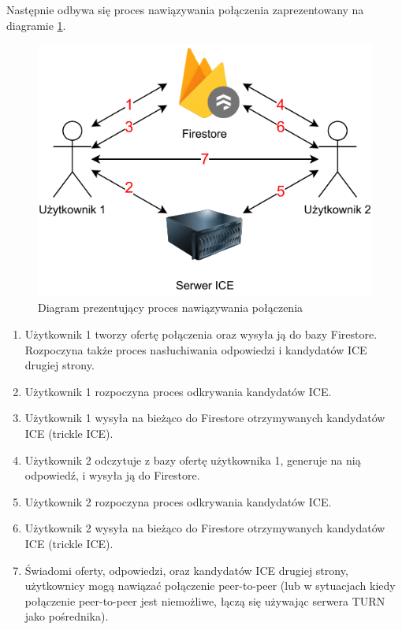 Następnie odbywa się proces nawiązywania połączenia zaprezentowany na diagramie \ref{fig:webrtc_connection_init}.

\begin{figure}[H]
  \centering
  \includegraphics{img/webrtc-connection-init}
  \caption{Diagram prezentujący proces nawiązywania połączenia}
  \label{fig:webrtc_connection_init}
\end{figure}

\begin{enumerate}
  \item Użytkownik 1 tworzy ofertę połączenia oraz wysyła ją do bazy Firestore. Rozpoczyna także proces nasłuchiwania
        odpowiedzi i kandydatów ICE drugiej strony.
  \item Użytkownik 1 rozpoczyna proces odkrywania kandydatów ICE.
  \item Użytkownik 1 wysyła na bieżąco do Firestore otrzymywanych kandydatów ICE (trickle ICE).
  \item Użytkownik 2 odczytuje z bazy ofertę użytkownika 1, generuje na nią odpowiedź, i wysyła ją do Firestore.
  \item Użytkownik 2 rozpoczyna proces odkrywania kandydatów ICE.
  \item Użytkownik 2 wysyła na bieżąco do Firestore otrzymywanych kandydatów ICE (trickle ICE).
  \item Świadomi oferty, odpowiedzi, oraz kandydatów ICE drugiej strony, użytkownicy mogą nawiązać połączenie
        peer-to-peer (lub w sytuacjach kiedy połączenie peer-to-peer jest niemożliwe, łączą się używając serwera TURN
        jako pośrednika).
        
\end{enumerate}

